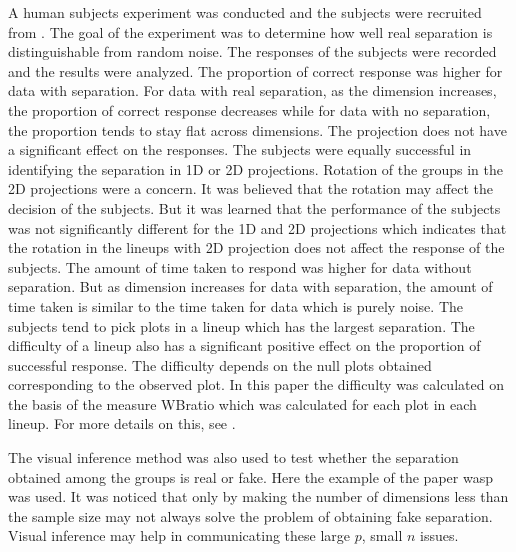  


A human subjects experiment was conducted and the subjects were recruited from \cite{turk}. The goal of the experiment was to determine how well real separation is distinguishable from random noise. The responses of the subjects were recorded and the results were analyzed. The proportion of correct response was higher for data with separation. For data with real separation, as the dimension increases, the proportion of correct response decreases while for data with no separation, the proportion tends to stay flat across dimensions. The projection does not have a significant effect on the responses. The subjects were equally successful in identifying the separation in 1D or 2D projections.
Rotation of the groups in the 2D projections were a concern. It was believed that the rotation may affect the decision of the subjects. But it was learned that the performance of the subjects was not significantly different for the 1D and 2D projections which indicates that the rotation in the lineups with 2D projection does not affect the response of the subjects. The amount of time taken to respond was higher for data without separation. But as dimension increases for data with separation, the amount of time taken is similar to the time taken for data which is purely noise. 
The subjects tend to pick plots in a lineup which has the largest separation. The difficulty of a lineup also has a significant positive effect on the proportion of successful response. The difficulty depends on the null plots obtained corresponding to the observed plot. In this paper the difficulty was calculated on the basis of the measure WBratio which was calculated for each plot in each lineup. For more details on this, see \cite{roychowdhury:2012}.

The visual inference method was also used to test whether the separation obtained among the groups is real or fake. Here the example of the paper wasp was used. It was noticed that only by making the number of dimensions less than the sample size may not always solve the problem of obtaining fake separation. Visual inference may help in communicating these large $p$, small $n$ issues. 

